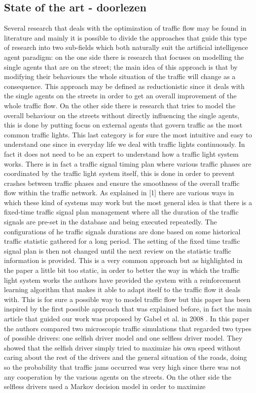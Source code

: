 \documentclass[a4paper,hidelinks]{article}
\begin{document}
\subsection{State of the art - doorlezen}
Several research that deals with the optimization of traffic flow may be found in literature and mainly it is possible to divide the approaches that guide this type of research into two sub-fields which both naturally suit the artificial intelligence agent paradigm: on the one side there is research that focuses on modelling the single agents that are on the street; the main idea of this approach is that by modifying their behaviours the whole situation of the traffic will change as a consequence. This approach may be defined as reductionistic since it deals with the single agents on the streets in order to get an overall improvement of the whole traffic flow. On the other side there is research that tries to model the overall behaviour on the streets without directly influencing the single agents, this is done by putting focus on external agents that govern traffic as the most common traffic lights. This last category is for sure the most intuitive and easy to understand one since in everyday life we deal with traffic lights continuously. In fact it does not need to be an expert to understand how a traffic light system works. There is in fact a traffic signal timing plan where various traffic phases are coordinated by the traffic light system itself, this is done in order to prevent crashes between traffic phases and ensure the smoothness of the overall traffic flow within the traffic network. As explained in [1] there are various ways in which these kind of systems may work but the most general idea is that there is a fixed-time traffic signal plan management where all the duration of the traffic signals are pre-set in the database and being executed repeatedly. The configurations of he traffic signals durations are done based on some historical traffic statistic gathered for a long period. The setting of the fixed time traffic signal plan is then not changed until the next review on the statistic traffic information is provided. This is a very common approach but as highlighted in the paper a little bit too static, in order to better the way in which the traffic light system works the authors have provided the system with a reinforcement learning algorithm that makes it able to adapt itself to the traffic flow it deals with. This is for sure a possible way to model traffic flow but this paper has been inspired by the first possible approach that was explained before, in fact the main article that guided our work was proposed by Gabel et al. in 2008 \cite{gabel2012cooperative}. In this paper the authors compared two microscopic traffic simulations that regarded two types of possible drivers: one selfish driver model and one selfless driver model. They showed that the selfish driver simply tried to maximize his own speed without caring about the rest of the drivers and the general situation of the roads, doing so the probability that traffic jams occurred was very high since there was not any cooperation by the various agents on the streets. On the other side the selfless drivers used a Markov decision model in order to maximize 
\end{document}
